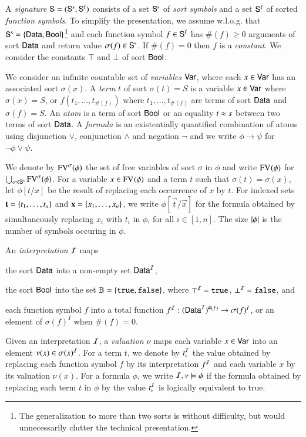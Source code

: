 \documentclass[10pt,conference,letterpaper,twocolumn]{IEEEtran}
\begin{document}
A \emph{signature} $\mathsf{S} = (\mathsf{S}^\mathrm{s},\mathsf{S}^\mathrm{f})$ consists of a
set $\mathsf{S}^\mathrm{s}$ of \emph{sort symbols} and a set $\mathsf{S}^\mathrm{f}$ of
sorted \emph{function symbols}. To simplify the presentation, we
assume w.l.o.g. that $\mathsf{S}^\mathrm{s} = \left\{ \mathsf{Data},\mathsf{Bool} \right\}$\footnote{The
  generalization to more than two sorts is without difficulty, but
  would unnecessarily clutter the technical presentation.} and each
function symbol $f \in \mathsf{S}^\mathrm{f}$ has $\#(f) \geq 0$ arguments of
sort $\mathsf{Data}$ and return value $\sigma(f) \in \mathsf{S}^\mathrm{s}$. If
$\#(f)=0$ then $f$ is a \emph{constant}. We consider the constants
$\top$ and $\bot$ of sort $\mathsf{Bool}$.

We consider an infinite countable set of \emph{variables} $\mathsf{Var}$,
where each $x \in \mathsf{Var}$ has an associated sort $\sigma(x)$. A
\emph{term} $t$ of sort $\sigma(t)=S$ is a variable $x \in \mathsf{Var}$
where $\sigma(x)=S$, or $f(t_1,\ldots,t_{\#(f)})$ where
$t_1,\ldots,t_{\#(f)}$ are terms of sort $\mathsf{Data}$ and $\sigma(f)=S$. An
\emph{atom} is a term of sort $\mathsf{Bool}$ or an equality $t \approx s$
between two terms of sort $\mathsf{Data}$. A \emph{formula} is an
existentially quantified combination of atoms using disjunction
$\vee$, conjunction $\wedge$ and negation $\neg$ and we write $\phi
\rightarrow \psi$ for $\neg\phi \vee \psi$.

We denote by $\mathrm{FV}^{\sigma}(\phi)$ the set of free variables of sort
$\sigma$ in $\phi$ and write $\mathrm{FV}^{}(\phi)$ for $\bigcup_{\sigma \in
  \mathsf{S}^\mathrm{s}} \mathrm{FV}^{\sigma}(\phi)$. For a variable $x \in
\mathrm{FV}^{}(\phi)$ and a term $t$ such that $\sigma(t) = \sigma(x)$, let
$\phi[t/x]$ be the result of replacing each occurrence of $x$ by
$t$. For indexed sets $\mathbf t=\left\{ t_1,\ldots,t_n \right\}$ and
$\mathbf x=\left\{ x_1,\ldots,x_n \right\}$, we write $\phi[\vec{t}/\vec{x}]$ for
the formula obtained by simultaneously replacing $x_i$ with $t_i$ in
$\phi$, for all $i\in[1,n]$. The size ${|{\phi}|}$ is the number of
symbols occuring in $\phi$.

An \emph{interpretation} $\mathcal{I}$ maps\begin{inparaenum}[(1)]
\item the sort $\mathsf{Data}$ into a non-empty set $\mathsf{Data}^{\mathcal{I}}$, 
%
\item the sort $\mathsf{Bool}$ into the set $\mathbb{B} = \left\{ \mathtt{true},\mathtt{false} \right\}$, where
  $\top^{\mathcal{I}} = \mathtt{true}$, $\bot^{\mathcal{I}} = \mathtt{false}$, and
%
\item each function symbol $f$ into a total function $f^{\mathcal{I}} :
  (\mathsf{Data}^{\mathcal{I}})^{\#(f)} \rightarrow \sigma(f)^I$, or an element of
  $\sigma(f)^I$ when $\#(f)=0$.
\end{inparaenum}
Given an interpretation $\mathcal{I}$, a \emph{valuation} $\nu$ maps each
variable $x \in \mathsf{Var}$ into an element $\nu(x) \in \sigma(x)^{\mathcal{I}}$. For
a term $t$, we denote by $t^{\mathcal{I}}_\nu$ the value obtained by replacing
each function symbol $f$ by its interpretation $f^{\mathcal{I}}$ and each
variable $x$ by its valuation $\nu(x)$. For a formula $\phi$, we write
$\mathcal{I},\nu \models \phi$ if the formula obtained by replacing each term
$t$ in $\phi$ by the value $t^{\mathcal{I}}_\nu$ is logically equivalent to true.
\end{document}
